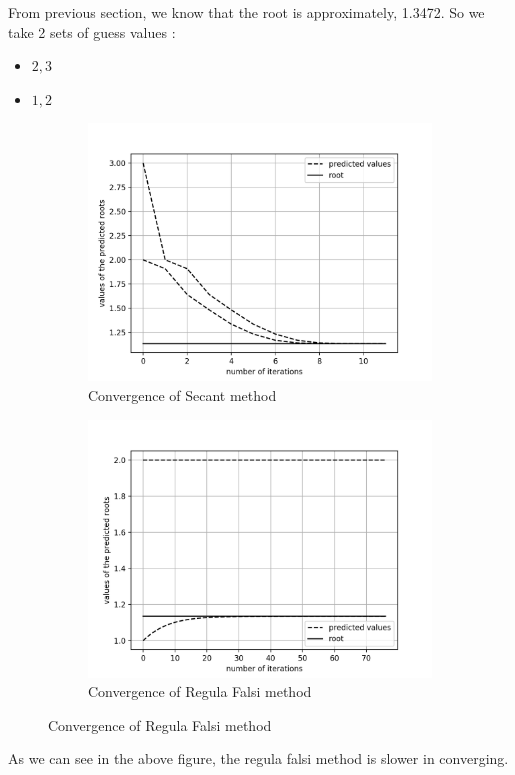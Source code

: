 \documentclass[12,a4paper]{article}
\begin{document}
    From previous section, we know that the root is approximately, 1.3472. So we take 2 sets of guess values :
    \begin{itemize}
        \item $2, 3$
        \item $1, 2$
    \end{itemize}
    \begin{figure}[h!]
        \centering
        \begin{subfigure}[t]{0.49\textwidth}
            \includegraphics[width=\textwidth]{plots/secant1.png}
            \caption{Convergence of Secant method}
            \label{fig:secant1}
        \end{subfigure}
        \begin{subfigure}[t]{0.49\textwidth}
            \includegraphics[width=\textwidth]{plots/secant2.png}
            \caption{Convergence of Regula Falsi method}
            \label{fig:secant2}
        \end{subfigure}
    \end{figure}
    As we can see in the above figure, the regula falsi method is slower in converging.
    \newpage
\end{document}
